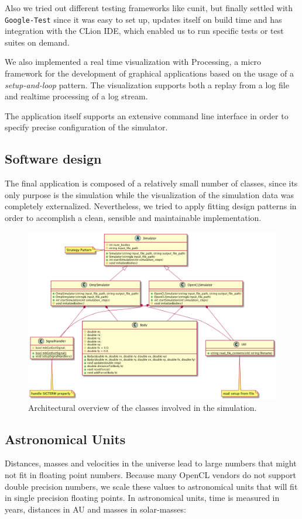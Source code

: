 \documentclass[a4paper,11pt]{scrartcl} %
\begin{document}
Also we tried out different testing frameworks like cunit, but finally settled with \texttt{Google-Test} since it was easy to set up, updates itself on build time and has integration with the CLion IDE, which enabled us to run specific tests or test suites on demand.

We also implemented a real time visualization with Processing, a micro framework for the development of graphical applications based on the usage of a \textit{setup-and-loop} pattern. The visualization supports both a replay from a log file and realtime processing of a log stream.

The application itself supports an extensive command line interface in order to specify precise configuration of the simulator.

\subsection{Software design}

The final application is composed of a relatively small number of classes, since its only purpose is the simulation while the visualization of the simulation data was completely externalized. Nevertheless, we tried to apply fitting design patterns in order to accomplish a clean, sensible and maintainable implementation.

\begin{figure}[h!]
	\centering
	\includegraphics[width=\textwidth]{img/classes.png}
	\caption{Architectural overview of the classes involved in the simulation.}
	\label{fig:classes}
\end{figure}

\subsection{Astronomical Units}
Distances, masses and velocities in the universe lead to large numbers that might not fit in floating
point numbers. Because many OpenCL vendors do not support double precision numbers, we scale these values to astronomical units that will fit in single precision floating points. In astronomical units, time is
measured in years, distances in AU and masses in solar-masses:
\end{document}

